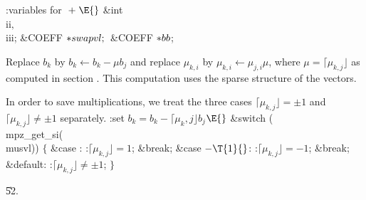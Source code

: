 \B{}:variables for \X${}\mathrel+\E{}$\6
\&{int} \\{ii}${},{}$ \\{iii};\6
\&{COEFF} ${}{*}\\{swapvl};{}$\6
\&{COEFF} ${}{*}\\{bb}{}$;\par
\fi

Replace $b_k$ by $b_k \leftarrow b_k - \mu b_j$ and replace
$\mu_{k,i}$ by $\mu_{k,i} \leftarrow \mu_{j,i}\mu$,
where $\mu = \lceil\mu_{k,j}\rfloor$ as computed in section
.
This computation uses the sparse structure of the vectors.

In order to save multiplications, we treat the three cases
$\lceil\mu_{k,j}\rfloor = \pm 1$ and $\lceil\mu_{k,j}\rfloor \neq \pm 1$
separately.
\Y\B\4:set $b_k = b_k - \lceil\mu_k,j\rfloor b_j$\X${}\E{}$\6
\&{switch} (\\{mpz\_get\_si}(\\{musvl}))\5
${}\{{}$\1\6
\4\&{case} :\5
:$\lceil\mu_{k,j}\rfloor = 1$\X;\6
\&{break};\6
\4\&{case} ${}{-}\T{1}{}$:\5
:$\lceil\mu_{k,j}\rfloor = -1$\X;\6
\&{break};\6
\4\&{default}:\5
:$\lceil\mu_{k,j}\rfloor \neq \pm 1$\X;\6
\4${}\}{}$\2\par
\U52.\fi

